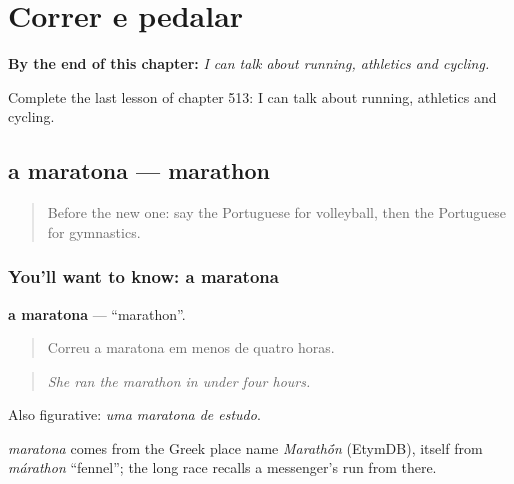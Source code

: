 
\chapter{Correr e pedalar}
\label{ch:pt-correr-e-pedalar}

\begin{chapteropening}
\textbf{By the end of this chapter:} \emph{I can talk about running, athletics and cycling.}

Complete the last lesson of chapter 513: I can talk about running, athletics and cycling.
\end{chapteropening}

\section[a maratona]{a maratona — marathon}

\label{lesson:PT-C513-maratona}



\begin{quote}
Before the new one: say the Portuguese for volleyball, then the Portuguese for gymnastics.
\end{quote}

\subsection*{You'll want to know: a maratona}
\textbf{a maratona} — \textquotedblleft{}marathon\textquotedblright{}.

\begin{quote}
Correu a maratona em menos de quatro horas.
\end{quote}

\begin{quote}
\emph{She ran the marathon in under four hours.}
\end{quote}

Also figurative: \emph{uma maratona de estudo}.

\begin{cousinweb}
\emph{maratona} comes from the Greek place name \emph{Marath\'{\={o}}n} (EtymDB), itself from \emph{márathon} \textquotedblleft{}fennel\textquotedblright{}; the long race recalls a messenger's run from there.
\end{cousinweb}

